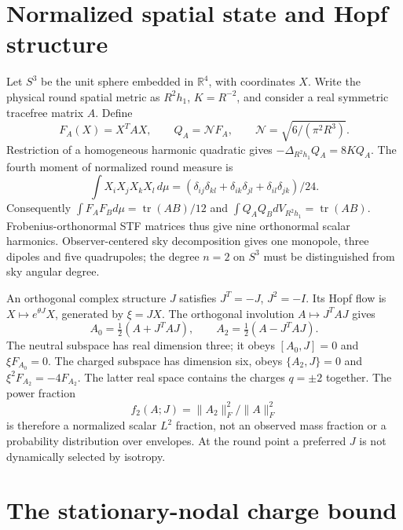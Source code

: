 \documentclass[11pt,a4paper]{article}
\newcommand{\tr}{\operatorname{tr}}\newcommand{\asympart}{\operatorname{Asym}}
\newcommand{\NN}{\mathcal N}\newcommand{\RR}{\mathcal R}
\begin{document}
\section{Normalized spatial state and Hopf structure}
\label{sec:geometry}

Let $S^3$ be the unit sphere embedded in $\mathbb R^4$, with coordinates
$X$. Write the physical round spatial metric as $R^2h_1$, $K=R^{-2}$,
and consider a real symmetric tracefree matrix $A$. Define
\begin{equation}
 F_A(X)=X^TAX,\qquad Q_A=\NN F_A,
 \qquad \NN=\sqrt{6/(\pi^2R^3)}.
 \label{eq:normalization}
\end{equation}
Restriction of a homogeneous harmonic quadratic gives
$-\Delta_{R^2h_1}Q_A=8KQ_A$. The fourth moment of normalized round
measure is
\begin{equation}
 \int X_iX_jX_kX_l\,d\mu=
 (\delta_{ij}\delta_{kl}+\delta_{ik}\delta_{jl}
 +\delta_{il}\delta_{jk})/24.
\end{equation}
Consequently $\int F_AF_Bd\mu=\tr(AB)/12$ and
$\int Q_AQ_BdV_{R^2h_1}=\tr(AB)$. Frobenius-orthonormal STF matrices
thus give nine orthonormal scalar harmonics. Observer-centered sky
decomposition gives one monopole, three dipoles and five quadrupoles;
the degree $n=2$ on $S^3$ must be distinguished from sky angular degree.

An orthogonal complex structure $J$ satisfies $J^T=-J$, $J^2=-I$.
Its Hopf flow is $X\mapsto e^{\theta J}X$, generated by $\xi=JX$.
The orthogonal involution $A\mapsto J^TAJ$ gives
\begin{equation}
 A_0=\tfrac12(A+J^TAJ),\qquad
 A_2=\tfrac12(A-J^TAJ).
 \label{eq:projectors}
\end{equation}
The neutral subspace has real dimension three; it obeys $[A_0,J]=0$
and $\xi F_{A_0}=0$. The charged subspace has dimension six, obeys
$\{A_2,J\}=0$ and $\xi^2F_{A_2}=-4F_{A_2}$. The latter real
space contains the charges $q=\pm2$ together. The power fraction
\begin{equation}
 f_2(A;J)=\|A_2\|_F^2/\|A\|_F^2
 \label{eq:f2}
\end{equation}
is therefore a normalized scalar $L^2$ fraction, not an observed mass
fraction or a probability distribution over envelopes. At the round
point a preferred $J$ is not dynamically selected by isotropy.

\section{The stationary-nodal charge bound}
\end{document}
